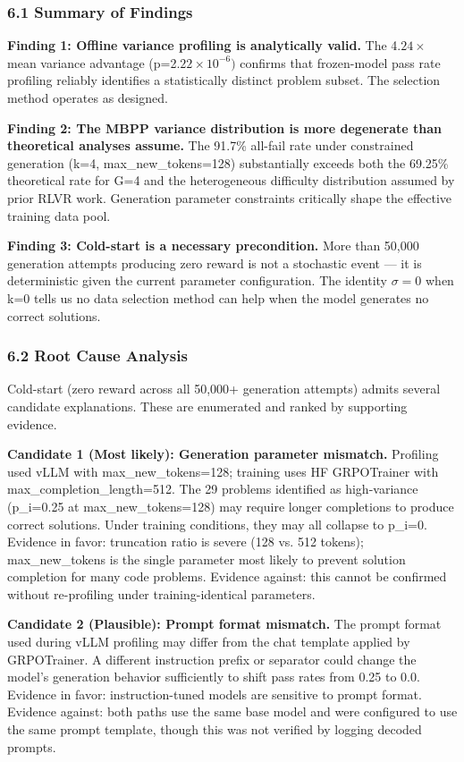 
\subsubsection{6.1 Summary of Findings}

\textbf{Finding 1: Offline variance profiling is analytically valid.} The 4.$24\times$ mean variance advantage (p=2.$22\times 10^{-6})$ confirms that frozen-model pass rate profiling reliably identifies a statistically distinct problem subset. The selection method operates as designed.

\textbf{Finding 2: The MBPP variance distribution is more degenerate than theoretical analyses assume.} The 91.7\% all-fail rate under constrained generation (k=4, max\_new\_tokens=128) substantially exceeds both the 69.25\% theoretical rate for G=4 \citep{Nie2026} and the heterogeneous difficulty distribution assumed by prior RLVR work. Generation parameter constraints critically shape the effective training data pool.

\textbf{Finding 3: Cold-start is a necessary precondition.} More than 50,000 generation attempts producing zero reward is not a stochastic event --- it is deterministic given the current parameter configuration. The identity $\sigma =0$ when k=0 tells us no data selection method can help when the model generates no correct solutions.

\subsubsection{6.2 Root Cause Analysis}

Cold-start (zero reward across all 50,000+ generation attempts) admits several candidate explanations. These are enumerated and ranked by supporting evidence.

\textbf{Candidate 1 (Most likely): Generation parameter mismatch.} Profiling used vLLM with max\_new\_tokens=128; training uses HF GRPOTrainer with max\_completion\_length=512. The 29 problems identified as high-variance (p\_i=0.25 at max\_new\_tokens=128) may require longer completions to produce correct solutions. Under training conditions, they may all collapse to p\_i=0. Evidence in favor: truncation ratio is severe (128 vs. 512 tokens); max\_new\_tokens is the single parameter most likely to prevent solution completion for many code problems. Evidence against: this cannot be confirmed without re-profiling under training-identical parameters.

\textbf{Candidate 2 (Plausible): Prompt format mismatch.} The prompt format used during vLLM profiling may differ from the chat template applied by GRPOTrainer. A different instruction prefix or separator could change the model's generation behavior sufficiently to shift pass rates from 0.25 to 0.0. Evidence in favor: instruction-tuned models are sensitive to prompt format. Evidence against: both paths use the same base model and were configured to use the same prompt template, though this was not verified by logging decoded prompts.

